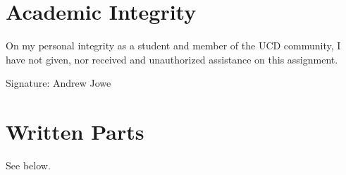 \documentclass[14pt]{extarticle}
\begin{document}
\section*{Academic Integrity}
On my personal integrity as a student and member of the UCD community, I have not given, nor received and unauthorized assistance on this assignment.

Signature: Andrew Jowe

\section*{Written Parts}
See below.



\end{document}
